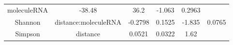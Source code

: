\documentclass[]{article}
\begin{document}
\begin{longtable}[]{@{}cccccc@{}}
\begin{minipage}[t]{0.24\columnwidth}
moleculeRNA\strut
\end{minipage} & \begin{minipage}[t]{0.11\columnwidth}\centering\strut
-38.48\strut
\end{minipage} & \begin{minipage}[t]{0.14\columnwidth}\centering\strut
36.2\strut
\end{minipage} & \begin{minipage}[t]{0.12\columnwidth}\centering\strut
-1.063\strut
\end{minipage} & \begin{minipage}[t]{0.09\columnwidth}\centering\strut
0.2963\strut
\end{minipage}\tabularnewline
\begin{minipage}[t]{0.12\columnwidth}\centering\strut
Shannon\strut
\end{minipage} & \begin{minipage}[t]{0.24\columnwidth}\centering\strut
distance:moleculeRNA\strut
\end{minipage} & \begin{minipage}[t]{0.11\columnwidth}\centering\strut
-0.2798\strut
\end{minipage} & \begin{minipage}[t]{0.14\columnwidth}\centering\strut
0.1525\strut
\end{minipage} & \begin{minipage}[t]{0.12\columnwidth}\centering\strut
-1.835\strut
\end{minipage} & \begin{minipage}[t]{0.09\columnwidth}\centering\strut
0.0765\strut
\end{minipage}\tabularnewline
\begin{minipage}[t]{0.12\columnwidth}\centering\strut
Simpson\strut
\end{minipage} & \begin{minipage}[t]{0.24\columnwidth}\centering\strut
distance\strut
\end{minipage} & \begin{minipage}[t]{0.11\columnwidth}\centering\strut
0.0521\strut
\end{minipage} & \begin{minipage}[t]{0.14\columnwidth}\centering\strut
0.0322\strut
\end{minipage} & \begin{minipage}[t]{0.12\columnwidth}\centering\strut
1.62\strut
\end{minipage} & \begin{minipage}[t]{0.09\columnwidth}\centering\strut

\end{minipage}
\end{longtable}
\end{document}

